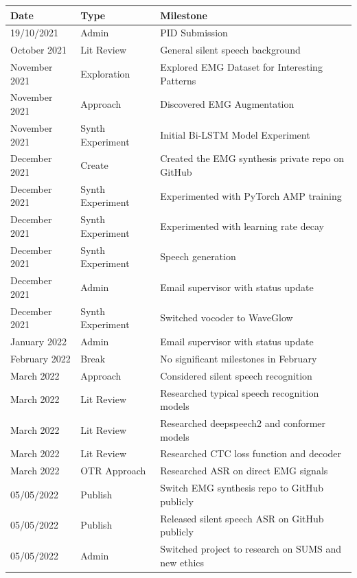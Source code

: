 {\small\begin{center}
    \begin{tabularx}{\textwidth}{ l l l }
        Date & Type & Milestone \\
        \hline
        19/10/2021 & Admin & PID Submission \\
        October 2021 & Lit Review & General silent speech background \\
        November 2021 & Exploration & Explored EMG Dataset for Interesting Patterns \\
        November 2021 & Approach & Discovered EMG Augmentation \\
        November 2021 & Synth Experiment & Initial Bi-LSTM Model Experiment \\
        December 2021 & Create & Created the EMG synthesis private repo on GitHub \\
        December 2021 & Synth Experiment & Experimented with PyTorch AMP training \\
        December 2021 & Synth Experiment & Experimented with learning rate decay \\
        December 2021 & Synth Experiment & Speech generation \\
        December 2021 & Admin & Email supervisor with status update \\
        December 2021 & Synth Experiment & Switched vocoder to WaveGlow \\
        January 2022 & Admin & Email supervisor with status update \\
        February 2022 & Break & No significant milestones in February \\
        March 2022 & Approach & Considered silent speech recognition \\
        March 2022 & Lit Review & Researched typical speech recognition models \\
        March 2022 & Lit Review & Researched deepspeech2 and conformer models \\
        March 2022 & Lit Review & Researched CTC loss function and decoder \\
        March 2022 & OTR Approach & Researched ASR on direct EMG signals \\
        05/05/2022 & Publish & Switch EMG synthesis repo to GitHub publicly \\
        05/05/2022 & Publish & Released silent speech ASR on GitHub publicly \\
        05/05/2022 & Admin & Switched project to research on SUMS and new ethics
    \end{tabularx}
\end{center}}

